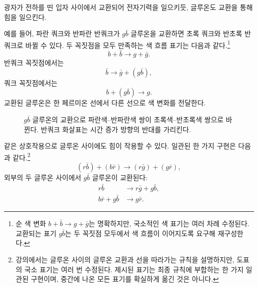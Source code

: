 광자가 전하를 띤 입자 사이에서 교환되어 전자기력을 일으키듯, 글루온도 교환을 통해 힘을 일으킨다.

예를 들어, 파란 쿼크와 반파란 반쿼크가 \(g\bar b\) 글루온을 교환하면 초록 쿼크와 반초록 반쿼크로 바뀔 수 있다. 두 꼭짓점을 모두 만족하는 색 흐름 표기는 다음과 같다.\footnote{순 색 변화 \(b+\bar b\longrightarrow g+\bar g\)는 명확하지만, 국소적인 색 표기는 여러 차례 수정된다. 교환되는 표기 \(g\bar b\)는 두 꼭짓점 모두에서 색 흐름이 이어지도록 요구해 재구성한다.}
\begin{equation}
b+\bar b
\longrightarrow
g+\bar g.
\end{equation}
반쿼크 꼭짓점에서는
\begin{equation}
\bar b\longrightarrow\bar g+(g\bar b),
\end{equation}
쿼크 꼭짓점에서는
\begin{equation}
b+(g\bar b)\longrightarrow g.
\end{equation}
교환된 글루온은 한 페르미온 선에서 다른 선으로 색 변화를 전달한다.

\begin{figure}[h]
\centering
{}
\caption{\(g\bar b\) 글루온의 교환으로 파란색--반파란색 쌍이 초록색--반초록색 쌍으로 바뀐다. 반쿼크 화살표는 시간 증가 방향의 반대를 가리킨다.}
\end{figure}

같은 상호작용으로 글루온 사이에도 힘이 작용할 수 있다. 일관된 한 가지 구현은 다음과 같다.\footnote{강의에서는 글루온 사이의 글루온 교환과 선을 따라가는 규칙을 설명하지만, 도표의 국소 표기는 여러 번 수정된다. 제시된 표기는 최종 규칙에 부합하는 한 가지 일관된 구현이며, 중간에 나온 모든 표기를 확실하게 옮긴 것은 아니다.}
\begin{equation}
(r\bar b)+(b\bar r)
\longrightarrow
(r\bar g)+(g\bar r),
\end{equation}
외부의 두 글루온 사이에서 \(g\bar b\) 글루온이 교환된다:
\begin{align}
r\bar b&\longrightarrow r\bar g+g\bar b,\\
b\bar r+g\bar b&\longrightarrow g\bar r.
\end{align}

